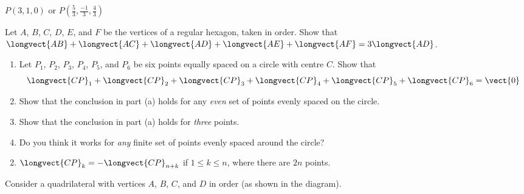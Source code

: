 \begin{multicols}{2}
\begin{ex}
\begin{sol}
$P(3, 1, 0)$ or $P(\frac{5}{3}, \frac{-1}{3}, \frac{4}{3})$
\end{sol}
\end{ex}

\begin{ex}
Let $A$, $B$, $C$, $D$, $E$, and $F$ be the vertices of a regular hexagon, taken in order. Show that $\longvect{AB} + \longvect{AC} + \longvect{AD} + \longvect{AE} + \longvect{AF} = 3\longvect{AD}$.
\end{ex}

\begin{ex}
\begin{enumerate}[label={\alph*.}]
\item Let $P_{1}$, $P_{2}$, $P_{3}$, $P_{4}$, $P_{5}$, and $P_{6}$ be six points equally spaced on a circle with centre $C$. Show that
\begin{equation*}
\longvect{CP}_{1} + \longvect{CP}_{2} + \longvect{CP}_{3} + \longvect{CP}_{4} + \longvect{CP}_{5} + \longvect{CP}_{6} = \vect{0}
\end{equation*}
\item Show that the conclusion in part (a) holds for any \textit{even} set of points evenly spaced on the circle.

\item Show that the conclusion in part (a) holds for \textit{three} points.

\item Do you think it works for \textit{any} finite set of points evenly spaced around the circle?

\end{enumerate}
\begin{sol}
\begin{enumerate}[label={\alph*.}]
\setcounter{enumi}{1}
\item  $\longvect{CP}_{k} = -\longvect{CP}_{n+k}$
 if $1 \leq k \leq n$, where there are $2n$ points.

\end{enumerate}
\end{sol}
\end{ex}


\begin{ex}
Consider a quadrilateral with vertices $A$, $B$, $C$, and $D$ in order (as shown in the diagram).


\begin{figure}[H]
\centering

\end{figure}


\end{ex}
\end{multicols}
